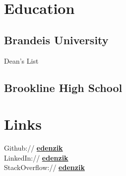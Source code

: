 \documentclass[]{deedy-resume}
\begin{document}
%
%
\lastupdated

%
%



%
%

\begin{minipage}[t]{0.33\textwidth} 


\section{Education} 

\subsection{Brandeis University}

Dean's List\\
\sectionsep

\subsection{Brookline High School}
\sectionsep


\section{Links} 
Github:// \href{https://github.com/edenzik}{\textbf{edenzik}} \\
LinkedIn://  \href{https://www.linkedin.com/in/edenzik}{\textbf{edenzik}} \\
StackOverflow://  \href{http://stackoverflow.com/users/2593964/}{\textbf{edenzik}} \\



\end{minipage}
\end{document}
